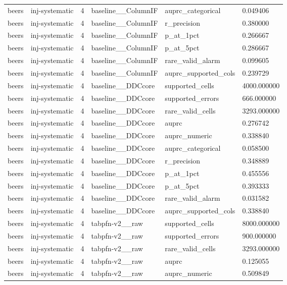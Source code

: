 \begin{tabular}{llllll}
beers & inj-systematic & 4 & baseline\_\_ColumnIF & auprc\_categorical & 0.049406 \\
beers & inj-systematic & 4 & baseline\_\_ColumnIF & r\_precision & 0.380000 \\
beers & inj-systematic & 4 & baseline\_\_ColumnIF & p\_at\_1pct & 0.266667 \\
beers & inj-systematic & 4 & baseline\_\_ColumnIF & p\_at\_5pct & 0.286667 \\
beers & inj-systematic & 4 & baseline\_\_ColumnIF & rare\_valid\_alarm & 0.099605 \\
beers & inj-systematic & 4 & baseline\_\_ColumnIF & auprc\_supported\_cols & 0.239729 \\
beers & inj-systematic & 4 & baseline\_\_DDCcore & supported\_cells & 4000.000000 \\
beers & inj-systematic & 4 & baseline\_\_DDCcore & supported\_errors & 666.000000 \\
beers & inj-systematic & 4 & baseline\_\_DDCcore & rare\_valid\_cells & 3293.000000 \\
beers & inj-systematic & 4 & baseline\_\_DDCcore & auprc & 0.276742 \\
beers & inj-systematic & 4 & baseline\_\_DDCcore & auprc\_numeric & 0.338840 \\
beers & inj-systematic & 4 & baseline\_\_DDCcore & auprc\_categorical & 0.058500 \\
beers & inj-systematic & 4 & baseline\_\_DDCcore & r\_precision & 0.348889 \\
beers & inj-systematic & 4 & baseline\_\_DDCcore & p\_at\_1pct & 0.455556 \\
beers & inj-systematic & 4 & baseline\_\_DDCcore & p\_at\_5pct & 0.393333 \\
beers & inj-systematic & 4 & baseline\_\_DDCcore & rare\_valid\_alarm & 0.031582 \\
beers & inj-systematic & 4 & baseline\_\_DDCcore & auprc\_supported\_cols & 0.338840 \\
beers & inj-systematic & 4 & tabpfn-v2\_\_raw & supported\_cells & 8000.000000 \\
beers & inj-systematic & 4 & tabpfn-v2\_\_raw & supported\_errors & 900.000000 \\
beers & inj-systematic & 4 & tabpfn-v2\_\_raw & rare\_valid\_cells & 3293.000000 \\
beers & inj-systematic & 4 & tabpfn-v2\_\_raw & auprc & 0.125055 \\
beers & inj-systematic & 4 & tabpfn-v2\_\_raw & auprc\_numeric & 0.509849 \\

\end{tabular}
